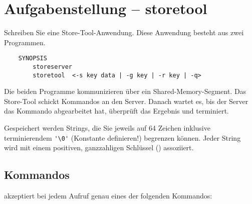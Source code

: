 




\section*{Aufgabenstellung -- storetool}

Schreiben Sie eine Store-Tool-Anwendung. Diese Anwendung besteht aus zwei
Programmen.

\begin{verbatim}
    SYNOPSIS
        storeserver
        storetool  <-s key data | -g key | -r key | -q>
\end{verbatim}

Die beiden Programme kommunizieren über ein Shared-Memory-Segment. Das
Store-Tool schickt Kommandos an den Server. Danach wartet es, bis der Server das
Kommando abgearbeitet hat, überprüft das Ergebnis und terminiert.

Gespeichert werden Strings, die Sie jeweils auf 64 Zeichen inklusive
terminierendem \verb_'\0'_ (Konstante definieren!) begrenzen können. Jeder
String wird mit einem positiven, ganzzahligen Schlüssel ()
assoziiert.

\subsection*{Kommandos}

 akzeptiert bei jedem Aufruf genau eines der folgenden
Kommandos:

